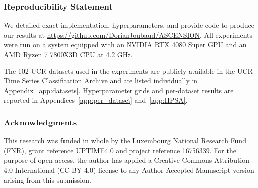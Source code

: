 \subsubsection*{Reproducibility Statement}
\label{sec:reproducibility}

We detailed exact implementation, hyperparameters, and provide
code to produce our results at
\url{https://github.com/DorianJoubaud/ASCENSION}.
All experiments were run on a system equipped with an NVIDIA
RTX 4080 Super GPU and an AMD Ryzen 7 7800X3D CPU at 4.2 GHz.

The 102 UCR datasets used in the experiments are publicly
available in the UCR Time Series Classification Archive
\citep{dau2019ucr} and are listed individually in
Appendix~\ref{app:datasets}. Hyperparameter grids and per-dataset results are
reported in Appendices~\ref{app:per_dataset}
and~\ref{app:HPSA}.

\subsubsection*{Acknowledgments}

This research was funded in whole by the Luxembourg National Research
Fund (FNR), grant reference UPTIME4.0 and project reference 16756339.
For the purpose of open access, the author has applied a Creative
Commons Attribution 4.0 International (CC BY 4.0) license to any
Author Accepted Manuscript version arising from this submission.
